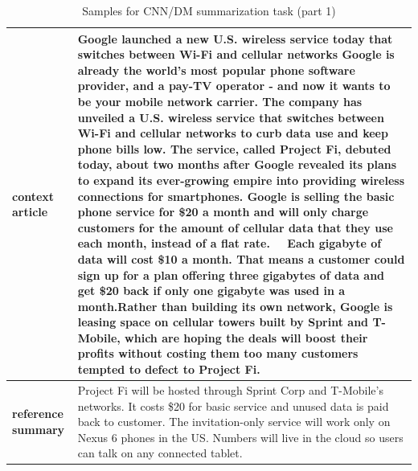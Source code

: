 
\begin{table}[t]
\begin{center}
\caption*{Samples for CNN/DM summarization task (part 1)}
\begin{tabular}{|p{2cm}|p{12cm}|}

\hline
    
\hline
\textbf{context article}
&
\multicolumn{1}{|C{12cm}|}{ 
Google launched a new U.S. wireless service today that switches between Wi-Fi and cellular networks
\newline\newline
Google is already the world's most popular phone software provider, and a pay-TV operator - and now it wants to be your mobile network carrier.
\newline\newline
The company has unveiled a U.S. wireless service that switches between Wi-Fi and cellular networks to curb data use and keep phone bills low.
\newline\newline
The service, called \textquotesingle{}Project Fi,\textquotesingle{} debuted today, about two months after Google revealed its plans to expand its ever-growing empire into providing wireless connections for smartphones.
\newline\newline
Google is selling the basic phone service for \$20 a month and will only charge customers for the amount of cellular data that they use each month, instead of a flat rate.  
\newline\newline
Each gigabyte of data will cost \$10 a month. That means a customer could sign up for a plan offering three gigabytes of data and get \$20 back if only one gigabyte was used in a month.\newline{}\newline\newline Rather than building its own network, Google is leasing space on cellular towers built by Sprint and T-Mobile, which are hoping the deals will boost their profits without costing them too many customers tempted to defect to Project Fi.
}
\\
\hline

\textbf{reference summary}
&
Project Fi will be hosted through Sprint Corp and T-Mobile's networks. It costs \$20 for basic service and unused data is paid back to customer. The invitation-only service will work only on Nexus 6 phones in the US. Numbers will live in the cloud so users can talk on any connected tablet.\\
\hline
\hline


\end{tabular}
\end{center}
\end{table}
